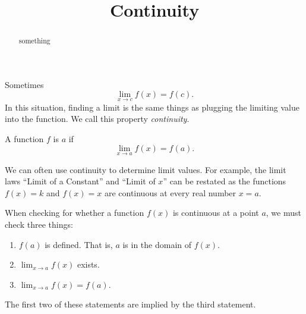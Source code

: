 \documentclass{ximera}
\title{Continuity}
\begin{document}
\begin{abstract}
  something
\end{abstract}
\maketitle

Sometimes
\[
\lim_{x\to c}f(x) = f(c).
\]
In this situation, finding a limit is the same things as plugging the
limiting value into the function.  We call this property
\textit{continuity}.

\begin{definition}
  A function $f$ is  $a$ if
  \[
  \lim_{x\to a}f(x) = f(a).
  \]
\end{definition}


We can often use continuity to determine limit values.  For example,
the limit laws ``Limit of a Constant'' and ``Limit of $x$'' can be
restated as the functions $f(x)=k$ and $f(x)=x$ are continuous at
every real number $x=a$.

When checking for whether a function $f(x)$ is continuous at a point
$a$, we must check three things:
\begin{enumerate}
\item $f(a)$ is defined.  That is, $a$ is in the domain of $f(x)$.
\item $\lim_{x\to a}f(x)$ exists.
\item $\lim_{x\to a} f(x) = f(a)$.
\end{enumerate}

The first two of these statements are implied by the third statement.
\end{document}
